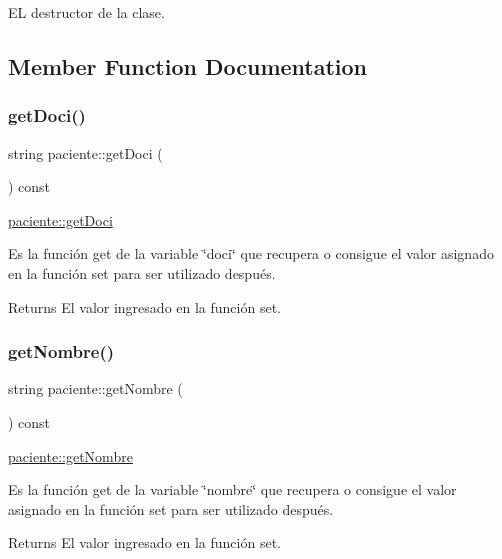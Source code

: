 EL destructor de la clase. 

\subsection{Member Function Documentation}
\mbox{\label{classpaciente_a35eb76c2a62bf5942a81f3ab0dfa7ae6}} 
\subsubsection{\texorpdfstring{get\+Doci()}{getDoci()}}
{\footnotesize\ttfamily string paciente\+::get\+Doci (\begin{DoxyParamCaption}{ }\end{DoxyParamCaption}) const}



\hyperlink{classpaciente_a35eb76c2a62bf5942a81f3ab0dfa7ae6}{paciente\+::get\+Doci} 

Es la función get de la variable \char`\"{}doci\char`\"{} que recupera o consigue el valor asignado en la función set para ser utilizado después. \begin{DoxyReturn}{Returns}
El valor ingresado en la función set. 
\end{DoxyReturn}
\mbox{\label{classpaciente_ade5b611666a067d54d8cee91bf737f2a}} 
\subsubsection{\texorpdfstring{get\+Nombre()}{getNombre()}}
{\footnotesize\ttfamily string paciente\+::get\+Nombre (\begin{DoxyParamCaption}{ }\end{DoxyParamCaption}) const}



\hyperlink{classpaciente_ade5b611666a067d54d8cee91bf737f2a}{paciente\+::get\+Nombre} 

Es la función get de la variable \char`\"{}nombre\char`\"{} que recupera o consigue el valor asignado en la función set para ser utilizado después. \begin{DoxyReturn}{Returns}
El valor ingresado en la función set. 
\end{DoxyReturn}
\mbox{\label{classpaciente_a6d34393d2eb8c21d66135346651a4995}} 
